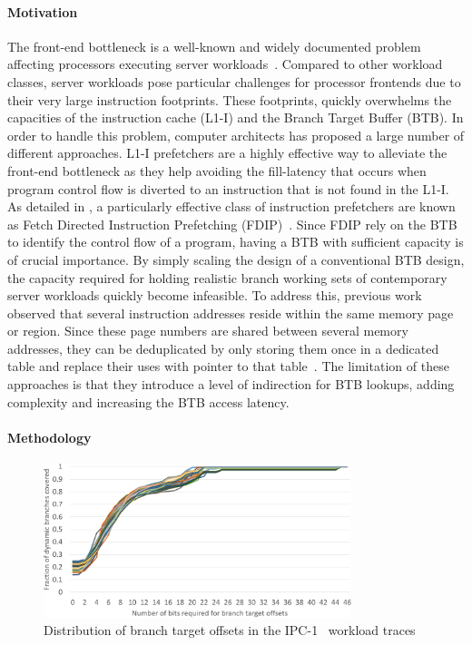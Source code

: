 \documentclass[../main.tex]{subfiles}
\begin{document}
\begin{refsection}
\paragraph{Motivation}
The front-end bottleneck is a well-known and widely documented problem affecting processors executing server workloads~\cite{ailamaki99_dbmss_moder_proces,ferdman12_clear_cloud,kanev15_profil,ayers19_asmdb}. Compared to other workload classes, server workloads pose particular challenges for processor frontends due to their very large instruction footprints. These footprints, quickly overwhelms the capacities of the instruction cache (L1-I) and the Branch Target Buffer (BTB). In order to handle this problem, computer architects has proposed a large number of different approaches. L1-I prefetchers are a highly effective way to alleviate the front-end bottleneck as they help avoiding the fill-latency that occurs when program control flow is diverted to an instruction that is not found in the L1-I.  As detailed in , a particularly effective class of instruction prefetchers are known as Fetch Directed Instruction Prefetching (FDIP)~\cite{reinman99_fetch_direc_instr_prefet}. Since FDIP rely on the BTB to identify the control flow of a program, having a BTB with sufficient capacity is of crucial importance. By simply scaling the design of a conventional BTB design, the capacity required for holding realistic branch working sets of contemporary server workloads quickly become infeasible. To address this, previous work observed that several instruction addresses reside within the same memory page or region. Since these page numbers are shared between several memory addresses, they can be deduplicated by only storing them once in a dedicated table and replace their uses with pointer to that table~\cite{seznec96_dont_use_page_number_point_it,soundararajan21_pdede}. The limitation of these approaches is that they introduce a level of indirection for BTB lookups, adding complexity and increasing the BTB access latency.

\paragraph{Methodology}

\begin{figure}[ht]
  \centering
  \includegraphics[width=0.8\textwidth]{figures/offset_distribution.pdf}
  \caption{\label{fig:offset-distr} Distribution of branch target offsets in the IPC-1~\cite{ipc1} workload traces}
\end{figure}


\end{refsection}
\end{document}
